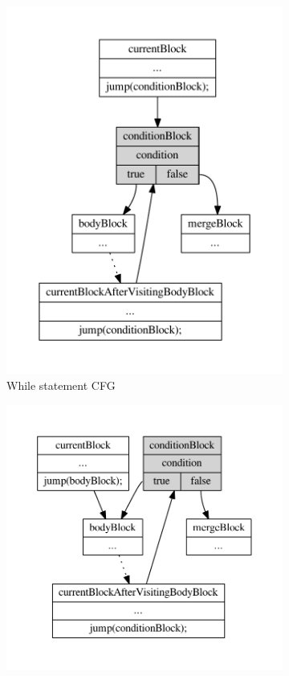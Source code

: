 \begin{figure}[htb]
{\begin{subfigure}[b]{0.4\textwidth}
        \includegraphics[width=\textwidth]{src/graph/while.pdf}
        \caption{While statement CFG\label{img:while-statement}}
    \end{subfigure}%
    \begin{subfigure}[b]{0.4\textwidth}
        \centering
        \includegraphics[width=\textwidth]{src/graph/do-while.pdf}

\end{subfigure}}
\end{figure}
